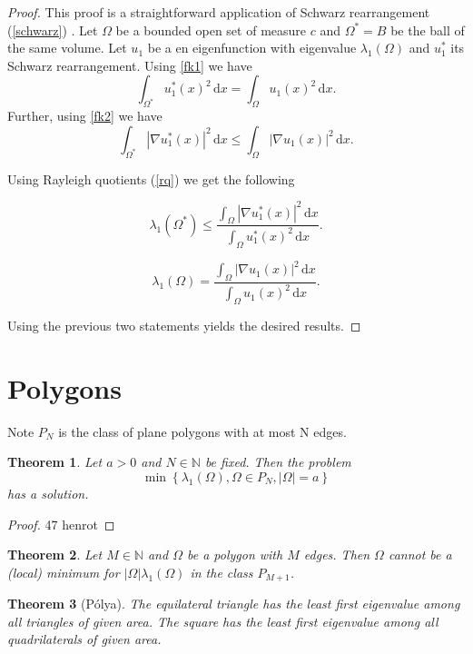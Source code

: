 \documentclass[12pt]{report}
\newtheorem{theorem}{Theorem}[section]
\numberwithin{definition}{section}
\begin{document}
\begin{proof}
  This proof is a straightforward application of Schwarz rearrangement (\ref{schwarz}) \cite{henrot}.
  Let $\Omega$ be a bounded open set of measure $c$ and $\Omega^* = B$ be the ball of the same volume.
  Let $u_1$ be a en eigenfunction with eigenvalue $\lambda_{1}(\Omega)$ and $u_1^*$ its Schwarz rearrangement.
  Using \ref{fk1} we have
  \[
   \int_{\Omega^{*}} \! u_1^{*}(x)^2 \, \mathrm{d}x = \int_{ \Omega} \! u_1(x)^2 \, \mathrm{d}x
  .\] 
  Further, using \ref{fk2} we have
  \[
     \int_{\Omega^{*}} \! | \nabla u_1^{*}(x) |^2 \, \mathrm{d}x \leq \int_\Omega \! | \nabla u_1(x)  |^2  \, \mathrm{d}x
  .\] 

  Using Rayleigh quotients (\ref{rq}) we get the following

  \[
    \lambda_{1}(\Omega^{*}) \leq \frac{\int_{\Omega} \! | \nabla u_1^{*}(x) |^2 \, \mathrm{d}x }{\int_{\Omega} \! u_1^{*}(x)^2 \, \mathrm{d}x }
  .\] 

  \[
    \lambda_{1}(\Omega) = \frac{\int_{ \Omega} \! | \nabla u_1(x) | ^2 \, \mathrm{d}x }{\int_{ \Omega} \! u_1(x)^2 \, \mathrm{d}x}
  .\] 

  Using the previous two statements yields the desired results.
\end{proof}

\break

\section{Polygons}

Note $P_{N}$ is the class of plane polygons with at most N edges.

\begin{theorem}
  Let $a > 0$ and $N \in \mathbb{N}$ be fixed.
  Then the problem
  \[
    \min \left\{ \lambda_{1}(\Omega), \Omega \in P_{N}, |\Omega| = a \right\} 
  \] 
  has a solution.
\end{theorem}

\begin{proof}
  47 henrot
\end{proof}

\begin{theorem}
  Let $M \in \mathbb{N}$ and $\Omega$ be a polygon with $M$ edges.
  Then $\Omega$ cannot be a (local) minimum for $|\Omega| \lambda_{1}(\Omega)$ in the class $P_{M+1}$.
\end{theorem}

\begin{theorem}[Pólya]
  The equilateral triangle has the least first eigenvalue among all triangles of given area.
  The square has the least first eigenvalue among all quadrilaterals of given area.
\end{theorem}
\end{document}
